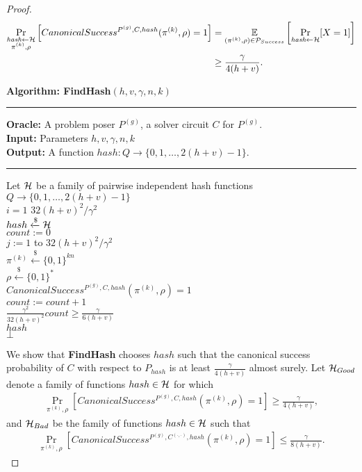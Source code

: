 \begin{proof}
\begin{align}
  \label{ineq:hash_high_prob}
\underset{\substack{\textit{hash} \leftarrow \mathcal{H} \\ \pi^{(k)}, \rho}}{\Pr}\left[CanonicalSuccess^{P^{(g)}, C, hash}(\pi^{(k)}, \rho) = 1\right] &=
\underset{{(\pi^{(k)},\rho) \in \mathcal{P}_{Success}}}{\mathbb{E}}\left[\underset{\substack{\textit{hash} \leftarrow \mathcal{H}}}{\Pr}[X = 1]\right] \notag\\
&\geq \frac{\gamma}{4(h+v)}.
\end{align}
%
\begin{codeblock}
  \textbf{Algorithm: FindHash}$(h, v, \gamma, n, k)$
  \medskip
  \hrule
  \medskip
  \textbf{Oracle:} A problem poser $P^{(g)}$, a solver circuit $C$ for $P^{(g)}$.\\
  \textbf{Input:} Parameters $ h,v,\gamma, n, k$\\
  \textbf{Output:} A function $hash:Q \rightarrow \{0,1, \dots, 2(h+v)-1 \}$.
  \medskip\hrule\medskip
  Let $\mathcal{H}$ be a family of pairwise independent hash functions $Q \rightarrow \{0,1,\dots, 2(h+v)-1\}$\\
  \For $i = 1$ \To $32(h+v)^2/\gamma^2$ \Do \\
  \IndI $hash \xleftarrow{\$} \mathcal{H}$ \\
  \IndI $count := 0$ \\
  \IndI \For $j := 1$ to $32(h+v)^2/\gamma^2$ \Do \\
  \IndII $\pi^{(k)} \xleftarrow{\$} \{0,1\}^{kn} $\\
  \IndII $\rho \xleftarrow{\$} \{0,1\}^*$ \\
  \IndII \If $CanonicalSuccess^{P^{(g)}, C, hash}(\pi^{(k)}, \rho) = 1$ \then \\
  \IndIII $count := count + 1$\\
  \IndI \If $\frac{\gamma^2}{32(h+v)^2} count \geq \frac{\gamma}{6(h+v)}$ \then \\
  \IndII \return $hash$\\
  \return $\bot$
\end{codeblock}
We show that \textbf{FindHash} chooses $hash$ such
that the canonical success probability of $C$
with respect to $P_{hash}$ is at least $\frac{\gamma}{4(h+v)}$ almost surely.
Let $\mathcal{H}_{Good}$ denote a family of functions $hash \in \mathcal{H}$ for which
\begin{align}
  \label{eq:hash_good}
\underset{\pi^{(k)}, \rho}{\Pr}\left[CanonicalSuccess^{P^{(g)}, C, hash}(\pi^{(k)}, \rho) = 1\right] \geq \frac{\gamma}{4(h+v)},
\end{align}
and $\mathcal{H}_{Bad}$ be the family of functions $hash \in \mathcal{H}$ such that
\begin{align}
  \label{eq:hash_bad}
\underset{\pi^{(k)}, \rho}{\Pr}\left[CanonicalSuccess^{P^{(g)}, C^{(\cdot, \cdot)}, hash}(\pi^{(k)}, \rho) = 1\right] \leq \frac{\gamma}{8(h+v)}.
\end{align}


\end{proof}

